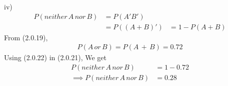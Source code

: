 \documentclass[journal,12pt,twocolumn]{IEEEtran}
\begin{document}
iv)
\begin{align}
    P(neither\, A\, nor\, B) &= P(A'B')\\
    &=P((A+B)')
    &=1-P(A+B)
\end{align}
From (2.0.19),
\begin{align}
    P(A\,or\,B) =P(A\,+\,B)=0.72
\end{align}
Using (2.0.22) in (2.0.21), We get
\begin{align}
    P(neither\, A\, nor\, B)&=1-0.72\\
   \implies P(neither\, A\, nor\, B)&=0.28
\end{align}
\end{document}
